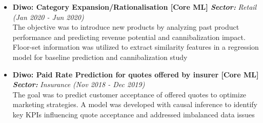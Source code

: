 \documentclass[a4paper,10pt]{article}
\newcommand{\isep}{-2 pt}
\begin{document}
\begin{itemize}
\item \textbf{Diwo: Category Expansion/Rationalisation  [Core ML] \qquad \emph{Sector:}} \emph{Retail} \hfill {\emph{(Jan 2020 - Jun 2020)}} \\
The objective was to introduce new products by analyzing past product performance and predicting revenue potential and cannibalization impact. Floor-set information was utilized to extract similarity features in a regression model for baseline prediction and cannibalization study 
\\ [-0.5cm]

\item \textbf{Diwo: Paid Rate Prediction for quotes offered by insurer  [Core ML] \qquad \emph{Sector:}} \emph{Insurance} \hfill {\emph{(Nov 2018 - Dec 2019)}}\\
The goal was to predict customer acceptance of offered quotes to optimize marketing strategies. A model was developed with causal inference to identify key KPIs influencing quote acceptance and addressed imbalanced data issues
\\ [-0.5cm]


\end{itemize}
\end{document}
